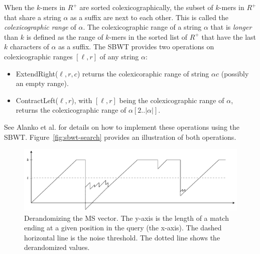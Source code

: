 \documentclass[unnumsec,webpdf,contemporary,large]{oup-authoring-template}%
\theoremstyle{thmstyleone}%
\theoremstyle{thmstyletwo}%
\theoremstyle{thmstylethree}%
\begin{document}
When the $k$-mers in $R^+$ are sorted colexicographically, the subset of $k$-mers in $R^+$ that share a string $\alpha$ as a suffix are next to each other. This is called the \emph{colexicographic range} of $\alpha$. The colexicographic range of a string $\alpha$ that is \emph{longer} than $k$ is defined as the range of $k$-mers in the sorted list of $R^+$ that have the last $k$ characters of $\alpha$ as a suffix. The SBWT provides two operations on colexicographic ranges $[\ell, r]$ of any string $\alpha$: 

\begin{itemize}
\item ExtendRight($\ell, r, c$) returns the colexicoraphic range of string $\alpha c$ (possibly an empty range).
\item ContractLeft($\ell, r$), with $[\ell, r]$ being the colexicographic range of $\alpha$, returns the colexicographic range of $\alpha[2..|\alpha|]$.
\end{itemize}

See Alanko et al. \cite{alanko2024finimizers} for details on how to implement these operations using the SBWT. Figure~\ref{fig:sbwt-search} provides an illustration of both operations.

\begin{figure}
    \centering
    \includegraphics[width=1.0\linewidth]{fig/derandomized_MS.drawio.pdf}
    \caption{Derandomizing the MS vector. The y-axis is the length of a match ending at a given position in the query (the x-axis). The dashed horizontal line is the noise threshold. The dotted line shows the derandomized values. }
    \label{fig:derandomization}
\end{figure}
\end{document}
